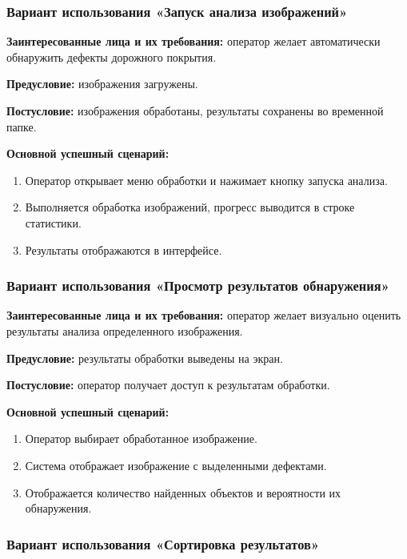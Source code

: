 \subsubsection{Вариант использования «Запуск анализа изображений»}

\textbf{Заинтересованные лица и их требования:} оператор желает автоматически обнаружить дефекты дорожного покрытия.

\textbf{Предусловие:} изображения загружены.

\textbf{Постусловие:} изображения обработаны, результаты сохранены во временной папке.

\textbf{Основной успешный сценарий:}

\begin{enumerate}
	\item Оператор открывает меню обработки и нажимает кнопку запуска анализа.
	\item Выполняется обработка изображений, прогресс выводится в строке статистики.
	\item Результаты отображаются в интерфейсе.
\end{enumerate}

\subsubsection{Вариант использования «Просмотр результатов обнаружения»}

\textbf{Заинтересованные лица и их требования:} оператор желает визуально оценить результаты анализа определенного изображения.

\textbf{Предусловие:} результаты обработки выведены на экран.

\textbf{Постусловие:} оператор получает доступ к результатам обработки.

\textbf{Основной успешный сценарий:}

\begin{enumerate}
	\item Оператор выбирает обработанное изображение.
	\item Система отображает изображение с выделенными дефектами.
	\item Отображается количество найденных объектов и вероятности их обнаружения.
\end{enumerate}

\subsubsection{Вариант использования «Сортировка результатов»}

